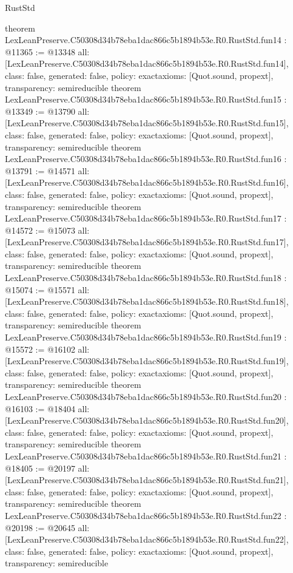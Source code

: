 \begin{lexlean}{RustStd}
\begin{coremodule}
{}
theorem LexLeanPreserve.C50308d34b78eba1dac866c5b1894b53e.R0.RustStd.fun14 : @11365 := @13348 {
  all: [LexLeanPreserve.C50308d34b78eba1dac866c5b1894b53e.R0.RustStd.fun14],
  class: false,
  generated: false,
  policy: exact{axioms: [Quot.sound, propext]},
  transparency: semireducible
}
theorem LexLeanPreserve.C50308d34b78eba1dac866c5b1894b53e.R0.RustStd.fun15 : @13349 := @13790 {
  all: [LexLeanPreserve.C50308d34b78eba1dac866c5b1894b53e.R0.RustStd.fun15],
  class: false,
  generated: false,
  policy: exact{axioms: [Quot.sound, propext]},
  transparency: semireducible
}
theorem LexLeanPreserve.C50308d34b78eba1dac866c5b1894b53e.R0.RustStd.fun16 : @13791 := @14571 {
  all: [LexLeanPreserve.C50308d34b78eba1dac866c5b1894b53e.R0.RustStd.fun16],
  class: false,
  generated: false,
  policy: exact{axioms: [Quot.sound, propext]},
  transparency: semireducible
}
theorem LexLeanPreserve.C50308d34b78eba1dac866c5b1894b53e.R0.RustStd.fun17 : @14572 := @15073 {
  all: [LexLeanPreserve.C50308d34b78eba1dac866c5b1894b53e.R0.RustStd.fun17],
  class: false,
  generated: false,
  policy: exact{axioms: [Quot.sound, propext]},
  transparency: semireducible
}
theorem LexLeanPreserve.C50308d34b78eba1dac866c5b1894b53e.R0.RustStd.fun18 : @15074 := @15571 {
  all: [LexLeanPreserve.C50308d34b78eba1dac866c5b1894b53e.R0.RustStd.fun18],
  class: false,
  generated: false,
  policy: exact{axioms: [Quot.sound, propext]},
  transparency: semireducible
}
theorem LexLeanPreserve.C50308d34b78eba1dac866c5b1894b53e.R0.RustStd.fun19 : @15572 := @16102 {
  all: [LexLeanPreserve.C50308d34b78eba1dac866c5b1894b53e.R0.RustStd.fun19],
  class: false,
  generated: false,
  policy: exact{axioms: [Quot.sound, propext]},
  transparency: semireducible
}
theorem LexLeanPreserve.C50308d34b78eba1dac866c5b1894b53e.R0.RustStd.fun20 : @16103 := @18404 {
  all: [LexLeanPreserve.C50308d34b78eba1dac866c5b1894b53e.R0.RustStd.fun20],
  class: false,
  generated: false,
  policy: exact{axioms: [Quot.sound, propext]},
  transparency: semireducible
}
theorem LexLeanPreserve.C50308d34b78eba1dac866c5b1894b53e.R0.RustStd.fun21 : @18405 := @20197 {
  all: [LexLeanPreserve.C50308d34b78eba1dac866c5b1894b53e.R0.RustStd.fun21],
  class: false,
  generated: false,
  policy: exact{axioms: [Quot.sound, propext]},
  transparency: semireducible
}
theorem LexLeanPreserve.C50308d34b78eba1dac866c5b1894b53e.R0.RustStd.fun22 : @20198 := @20645 {
  all: [LexLeanPreserve.C50308d34b78eba1dac866c5b1894b53e.R0.RustStd.fun22],
  class: false,
  generated: false,
  policy: exact{axioms: [Quot.sound, propext]},
  transparency: semireducible
}
\end{coremodule}
\end{lexlean}
